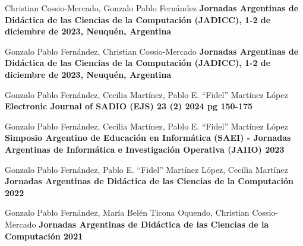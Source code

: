 \begin{enumerate}[leftmargin=0.8cm]
{\begin{itemize}[leftmargin=0.2cm]
      {Christian Cossio-Mercado, Gonzalo Pablo Fernández}
      {\textbf{Jornadas Argentinas de Didáctica de las Ciencias de la Computación (JADICC), 1-2 de diciembre de 2023, Neuquén, Argentina}}

      {Gonzalo Pablo Fernández, Christian Cossio-Mercado}
      {\textbf{Jornadas Argentinas de Didáctica de las Ciencias de la Computación (JADICC), 1-2 de diciembre de 2023, Neuquén, Argentina}}

      {Gonzalo Pablo Fernández, Cecilia Martínez, Pablo E. ``Fidel'' Martínez López}
      {\textbf{Electronic Journal of SADIO (EJS) 23 (2) 2024 pg 150-175}}

      {Gonzalo Pablo Fernández, Cecilia Martínez, Pablo E. ``Fidel'' Martínez López}
      {\textbf{Simposio Argentino de Educación en Informática (SAEI) - Jornadas Argentinas de Informática e Investigación Operativa (JAIIO) 2023}}

      {Gonzalo Pablo Fernández, Pablo E. ``Fidel'' Martínez López, Cecilia Martínez}
      {\textbf{Jornadas Argentinas de Didáctica de las Ciencias de la Computación 2022}}

      {Gonzalo Pablo Fernández, María Belén Ticona Oquendo, Christian Cossio-Mercado}
      {\textbf{Jornadas Argentinas de Didáctica de las Ciencias de la Computación 2021}}


\end{itemize}}
\end{enumerate}
